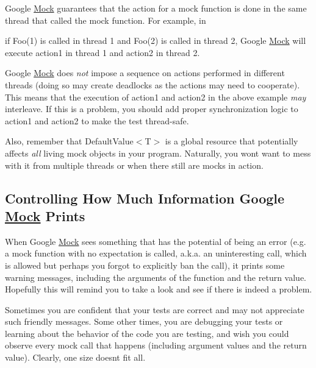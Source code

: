 Google \mbox{\hyperlink{classMock}{Mock}} guarantees that the action for a mock function is done in the same thread that called the mock function. For example, in


\begin{DoxyCode}{0}
\end{DoxyCode}


if {\ttfamily Foo(1)} is called in thread 1 and {\ttfamily Foo(2)} is called in thread 2, Google \mbox{\hyperlink{classMock}{Mock}} will execute {\ttfamily action1} in thread 1 and {\ttfamily action2} in thread 2.

Google \mbox{\hyperlink{classMock}{Mock}} does {\itshape not} impose a sequence on actions performed in different threads (doing so may create deadlocks as the actions may need to cooperate). This means that the execution of {\ttfamily action1} and {\ttfamily action2} in the above example {\itshape may} interleave. If this is a problem, you should add proper synchronization logic to {\ttfamily action1} and {\ttfamily action2} to make the test thread-\/safe.

Also, remember that {\ttfamily Default\+Value$<$T$>$} is a global resource that potentially affects {\itshape all} living mock objects in your program. Naturally, you won\textquotesingle{}t want to mess with it from multiple threads or when there still are mocks in action.

\subsection*{Controlling How Much Information Google \mbox{\hyperlink{classMock}{Mock}} Prints}

When Google \mbox{\hyperlink{classMock}{Mock}} sees something that has the potential of being an error (e.\+g. a mock function with no expectation is called, a.\+k.\+a. an uninteresting call, which is allowed but perhaps you forgot to explicitly ban the call), it prints some warning messages, including the arguments of the function and the return value. Hopefully this will remind you to take a look and see if there is indeed a problem.

Sometimes you are confident that your tests are correct and may not appreciate such friendly messages. Some other times, you are debugging your tests or learning about the behavior of the code you are testing, and wish you could observe every mock call that happens (including argument values and the return value). Clearly, one size doesn\textquotesingle{}t fit all.

